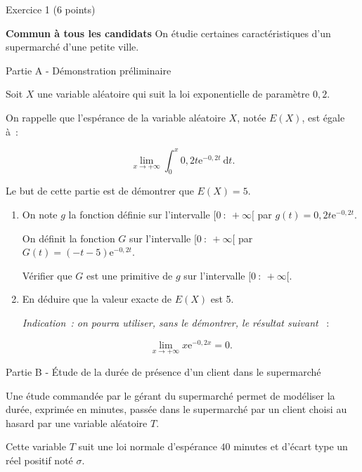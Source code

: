 
%
\begin{h2}Exercice 1 (6 points)\end{h2}
\textbf{Commun à  tous les candidats}
\medskip
On étudie certaines caractéristiques d'un supermarché d'une petite ville.
\bigskip
\begin{center}\begin{h3}Partie A - Démonstration préliminaire \end{h3}\end{center}
\medskip
Soit $X$ une variable aléatoire qui suit la loi exponentielle de paramètre $0,2$.
\par
On rappelle que l'espérance de la variable aléatoire $X$, notée $E(X)$, est égale à~:
\par
\[\displaystyle\lim_{x \to + \infty}\displaystyle\int_{0}^{x}  0,2t\text{e}^{-0,2t}\:\text{d}t.\]
\par
Le but de cette partie est de démontrer que $E(X) = 5$.
\medskip
\begin{enumerate}
     \item On note $g$ la fonction définie sur l'intervalle $[0~:~+\infty[$ par $g(t) = 0,2t\text{e}^{-0,2t}$.
     \par
     On définit la fonction $G$ sur l'intervalle $[0~:~+\infty[$ par $G(t) = (- t - 5)\text{e}^{-0,2t}$.
     \par
     Vérifier que $G$ est une primitive de $g$ sur l'intervalle $[0~:~+\infty[$.
     \item  En déduire que la valeur exacte de $E(X)$ est 5.
     \par
     \emph{Indication~: on pourra utiliser, sans le démontrer, le résultat suivant }~:
     \par
     \[\displaystyle\lim_{x \to + \infty} x \text{e}^{- 0,2x} = 0.\]
\end{enumerate}
\bigskip
\begin{center}\begin{h3}Partie B - Étude de la durée de présence d'un client dans le supermarché \end{h3}\end{center}
\medskip
Une étude commandée par le gérant du supermarché permet de modéliser la durée, exprimée en
minutes, passée dans le supermarché par un client choisi au hasard par une variable aléatoire $T$.
\par
Cette variable $T$ suit une loi normale d'espérance $40$ minutes et d'écart type un réel positif noté $\sigma$.
